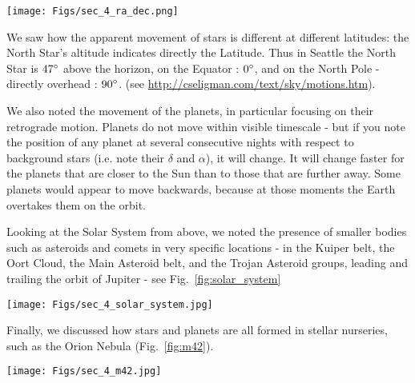 \documentclass[paper=a4, fontsize=11pt]{scrartcl} %
\numberwithin{equation}{section} %
\begin{document}
\begin{figure*}
\centering
	\texttt{[image: Figs/sec\_4\_ra\_dec.png]}
	\caption[RaDec]{The equatorial coordinates.}
	\label{fig:radec}
\end{figure*}  

We saw how the apparent movement of stars is different at different latitudes: the North Star's altitude indicates directly the Latitude. Thus in Seattle the North Star is  $47\degree$ above the horizon, on the Equator : $0 \degree$, and on the North Pole - directly overhead : $90 \degree$.  (see \url{http://cseligman.com/text/sky/motions.htm}). 

We also noted the movement of the planets, in particular focusing on their retrograde motion. Planets do not move within visible timescale - but if you note the position of any planet at several consecutive nights with respect to background stars (i.e. note their $\delta$ and $\alpha$), it will change. It will change faster for the planets that are closer to the Sun  than to those  that are further away.  Some planets would  appear to move backwards, because at those moments the Earth overtakes them on the orbit.  

Looking at the Solar System from above, we noted the presence of smaller bodies such as asteroids and comets in very specific locations - in the Kuiper belt, the Oort Cloud, the Main Asteroid belt, and the Trojan Asteroid groups, leading and trailing the orbit of Jupiter - see Fig.~\ref{fig:solar_system}


\begin{figure*}
\centering
	\texttt{[image: Figs/sec\_4\_solar\_system.jpg]}
	\caption[SolarSystem]{An overview of the Solar System, adapted from \url{http://elements.geoscienceworld.org/}}
	\label{fig:solar_system}
\end{figure*}

Finally, we discussed how stars and planets are all formed in stellar nurseries, such as the Orion Nebula (Fig.~\ref{fig:m42}).

\begin{figure*}
\centering
	\texttt{[image: Figs/sec\_4\_m42.jpg]}
	\caption[stellarnurseries]{An image of the M42 nebula.}
	\label{fig:m42}
\end{figure*}


\end{document}
